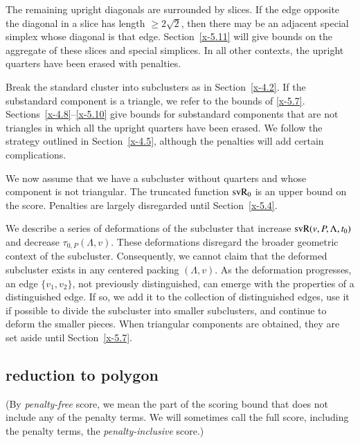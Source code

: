 The remaining upright diagonals are surrounded by slices. If
the edge opposite the diagonal in a slice has length
$\ge2\sqrt2$, then there may be an adjacent special simplex whose
diagonal is that edge.  Section~\ref{x-5.11} will give bounds on the
aggregate of these slices and special simplices.  In all
other contexts, the upright quarters have been erased with penalties.

Break the standard cluster into subclusters as in Section~\ref{x-4.2}.
If the substandard component is a triangle, we refer to the bounds of \ref{x-5.7}.
Sections~\ref{x-4.8}--\ref{x-5.10} give bounds for substandard components that are
not triangles in which all the upright quarters have been erased. We
follow the strategy outlined in Section~\ref{x-4.5}, although the
penalties will add certain complications.

We now assume that we have a subcluster without quarters and whose
component is not triangular.  The truncated function ${\operatorname{svR}}_0$ is an
upper bound on the score.  Penalties are largely disregarded until
Section~\ref{x-5.4}.

We describe a series of deformations of the subcluster that
increase ${\operatorname{svR}}(v,P,\Lambda,t_0)$ and decrease $\tau_{0,P}(\Lambda,v)$.  These
deformations disregard the broader geometric context of the
subcluster. Consequently, we cannot claim that the deformed
subcluster exists in any centered packing $(\Lambda,v)$.  As the deformation
progresses, an edge $\{v_1,v_2\}$, not previously distinguished,
can emerge with the properties of a distinguished edge. If so, we
add it to the collection of distinguished edges, use it if
possible to divide the subcluster into smaller subclusters, and
continue to deform the smaller pieces.  When triangular components
are obtained, they are set aside until Section~\ref{x-5.7}.

\subsection{reduction to polygon} %





\begin{definition}
(By {\it penalty-free\/} score, we mean the part of the scoring
bound that does not include any of the penalty terms.  We will
sometimes call the full score, including the penalty terms, the
{\it penalty-inclusive\/} score.)
\end{definition}

